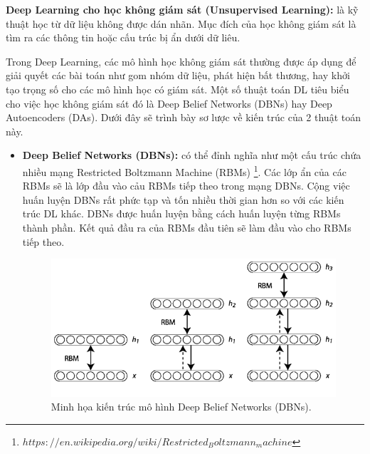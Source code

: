 \textbf{Deep Learning cho học không giám sát (Unsupervised
Learning):} là kỹ thuật học từ dữ liệu không được dán nhãn. Mục đích của học không giám sát là tìm ra các thông tin hoặc cấu trúc bị ẩn dưới dữ liêu.\par
Trong Deep Learning, các mô hình học không giám sát thường được áp dụng để giải quyết các bài toán như gom nhóm dữ liệu, phát hiện bất thương, hay khởi tạo trọng số cho các mô hình học có giám sát. Một số thuật toán DL tiêu biểu cho việc học không giám sát đó là Deep Belief Networks (DBNs) hay Deep Autoencoders (DAs). Dưới đây sẽ trình bày sơ lược về kiến trúc của 2 thuật toán này. 
\begin{itemize}
	\item \textbf{Deep Belief Networks (DBNs):} có thể đỉnh nghĩa như một cấu trúc chứa nhiều mạng Restricted Boltzmann Machine (RBMs) \footnote{$https://en.wikipedia.org/wiki/Restricted_Boltzmann_machine$}. Các lớp ẩn của các RBMs sẽ là lớp đầu vào cảu RBMs tiếp theo trong mạng DBNs. Cộng việc huấn luyện DBNs rất phức tạp và tốn nhiều thời gian hơn so với các kiến trúc DL khác. DBNs được huấn luyện bằng cách huấn luyện từng RBMs thành phần. Kết quả đầu ra của RBMs đầu tiên sẽ làm đầu vào cho RBMs tiếp theo. 
\begin{figure}[t]
  			\begin{center}
    				\includegraphics[scale=0.6]{DBNs}
    				\caption{Minh họa kiến trúc mô hình Deep Belief Networks (DBNs).} 
    				\label{CNN_chu}
  			\end{center}
\end{figure}		


\end{itemize}
